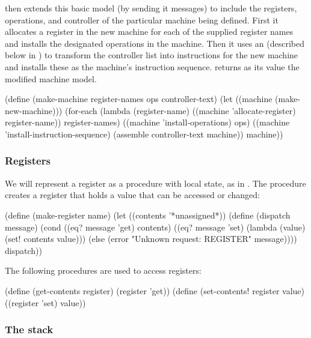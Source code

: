  then extends this basic model (by sending it messages) to
include the registers, operations, and controller of the particular machine
being defined.  First it allocates a register in the new machine for each of
the supplied register names and installs the designated operations in the
machine.  Then it uses an  (described below in
) to transform the controller list into instructions for the new
machine and installs these as the machine's instruction sequence.
 returns as its value the modified machine model.

\begin{codeBlock}
(define (make-machine register-names
                      ops
                      controller-text)
  (let ((machine (make-new-machine)))
    (for-each
     (lambda (register-name)
       ((machine 'allocate-register) register-name))
     register-names)
    ((machine 'install-operations) ops)
    ((machine 'install-instruction-sequence)
     (assemble controller-text machine))
    machine))
\end{codeBlock}

\subsubsection*{Registers}

We will represent a register as a procedure with local state, as in
.  The procedure  creates a register that
holds a value that can be accessed or changed:

\begin{codeBlock}
(define (make-register name)
  (let ((contents '*unassigned*))
    (define (dispatch message)
      (cond ((eq? message 'get) contents)
            ((eq? message 'set)
             (lambda (value) (set! contents value)))
            (else
             (error "Unknown request: REGISTER"
                    message))))
    dispatch))
\end{codeBlock}

\noindent
The following procedures are used to access registers:

\begin{codeBlock}
(define (get-contents register) (register 'get))
(define (set-contents! register value)
  ((register 'set) value))
\end{codeBlock}

\subsubsection*{The stack}


